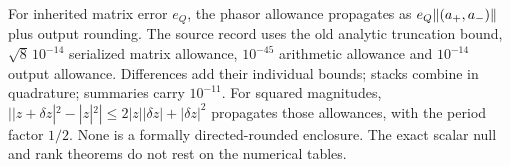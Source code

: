 For inherited matrix error $e_Q$, the phasor allowance propagates as $e_Q\lVert(a_+,a_-)\rVert$ plus output rounding. The source record uses the old analytic truncation bound, $\sqrt8\,10^{-14}$ serialized matrix allowance, $10^{-45}$ arithmetic allowance and $10^{-14}$ output allowance. Differences add their individual bounds; stacks combine in quadrature; summaries carry $10^{-11}$. For squared magnitudes, $||z+\delta z|^2-|z|^2|\le2|z||\delta z|+|\delta z|^2$ propagates those allowances, with the period factor $1/2$. None is a formally directed-rounded enclosure. The exact scalar null and rank theorems do not rest on the numerical tables.
